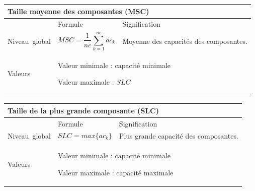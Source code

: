 \documentclass{article}
\begin{document}
\begin{table}[H]
\begin{tabular}{|m{3.24cm}|m{4.4810004cm}m{7.924cm}|}

\hline
\multicolumn{3}{|m{16.044998cm}|}{Taille moyenne des composantes (MSC)}\\\hline
 &
\multicolumn{1}{m{4.4810004cm}|}{Formule} &
Signification\\\hline
Niveau~global &
\multicolumn{1}{m{4.4810004cm}|}{\begin{equation*}
\mathit{MSC}=\frac{1}{\mathit{nc}}\sum _{k=1}^{\mathit{nc}}{{\mathit{ac}}_{k}}
\end{equation*}
} &
Moyenne des capacités des composantes.

\\\hline
Valeurs &
\multicolumn{2}{m{12.6050005cm}|}{Valeur minimale : capacité minimale

Valeur maximale :  $\mathit{SLC}$

}\\\hline
\end{tabular}
\end{table}


\begin{table}[H]
\begin{tabular}{|m{3.24cm}|m{4.4810004cm}m{7.924cm}|}

\hline
\multicolumn{3}{|m{16.044998cm}|}{Taille de la plus grande composante (SLC)}\\\hline
 &
\multicolumn{1}{m{4.4810004cm}|}{Formule} &
Signification\\\hline
Niveau~global &
\multicolumn{1}{m{4.4810004cm}|}{\begin{equation*}
\mathit{SLC}=\mathit{max}\{{\mathit{ac}}_{k}\}
\end{equation*}
} &
Plus grande capacité des composantes.

\\\hline
Valeurs &
\multicolumn{2}{m{12.6050005cm}|}{Valeur minimale : capacité minimale

Valeur maximale : capacité maximale

}\\\hline
\end{tabular}
\end{table}
\end{document}
